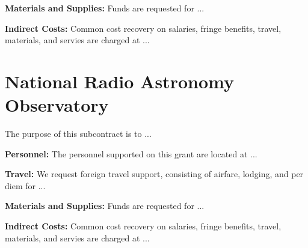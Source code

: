 \documentclass[onecolumn,11pt]{aastex}
\begin{document}
{\bf Materials and Supplies:}  Funds are requested for ... 

{\bf Indirect Costs:}
Common cost recovery on salaries, fringe benefits, travel, materials, and servies are
charged at ...



\section*{National Radio Astronomy Observatory}
The purpose of this subcontract is to ...

{\bf Personnel:} 
The personnel supported on this grant are located at ...

{\bf Travel:} We request foreign travel support, consisting of airfare, lodging,
and per diem for ...

{\bf Materials and Supplies:}  Funds are requested for ... 

{\bf Indirect Costs:}
Common cost recovery on salaries, fringe benefits, travel, materials, and servies are
charged at ...
\end{document}
